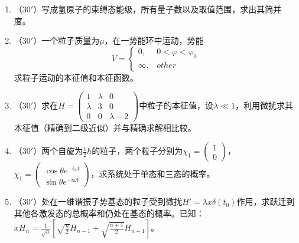

\begin{enumerate}
	\item
（$30'$）写成氢原子的束缚态能级，所有量子数以及取值范围，求出其简并度。


\banswer{
	
}


\item 
（$30'$）一个粒子质量为$\mu$，在一势能环中运动，势能
$$V=\begin{cases}0,&0<\varphi<\varphi_0\\ \infty,&other\end{cases}$$
求粒子运动的本征值和本征函数。


\banswer{
	
}


\item 
（$30'$）求在$H=\begin{pmatrix}1&\lambda &0\\ \lambda &3&0 \\ 0&0& \lambda-2\end{pmatrix}$中粒子的本征值，设$\lambda \ll 1$，利用微扰求其本征值（精确到二级近似）并与精确求解相比较。


\banswer{
	
}




\newpage
\item 
（$30'$）两个自旋为$\frac{1}{2}\hbar$的粒子，两个粒子分别为$\chi_1=\begin{pmatrix}1\\0\end{pmatrix}$，$\chi_1=\begin{pmatrix}\cos\theta e^{-i\omega t}\\ \sin\theta e^{-i\omega t}\end{pmatrix}$，求系统处于单态和三态的概率。

\banswer{
	
}


\item 
（$30'$）处在一维谐振子势基态的粒子受到微扰$H'=\lambda x\delta(t_0)$作用，求跃迁到其他各激发态的总概率和仍处在基态的概率。已知：
$xH_n=\frac{1}{\sqrt a}\left[\sqrt{\frac{n}{2}}H_{n-1}+\sqrt{\frac{n+1}{2}}H_{n+1}\right]$。

\banswer{
	
}



\end{enumerate}

